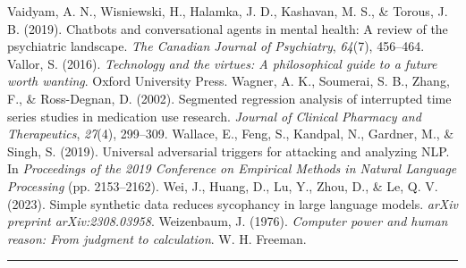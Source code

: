 \documentclass{obelus-preprint}
\begin{document}
Vaidyam, A. N., Wisniewski, H., Halamka, J. D., Kashavan, M. S., \& Torous, J. B. (2019). Chatbots and conversational agents in mental health: A review of the psychiatric landscape. \emph{The Canadian Journal of Psychiatry}, \emph{64}(7), 456--464.
Vallor, S. (2016). \emph{Technology and the virtues: A philosophical guide to a future worth wanting}. Oxford University Press.
Wagner, A. K., Soumerai, S. B., Zhang, F., \& Ross-Degnan, D. (2002). Segmented regression analysis of interrupted time series studies in medication use research. \emph{Journal of Clinical Pharmacy and Therapeutics}, \emph{27}(4), 299--309.
Wallace, E., Feng, S., Kandpal, N., Gardner, M., \& Singh, S. (2019). Universal adversarial triggers for attacking and analyzing NLP. In \emph{Proceedings of the 2019 Conference on Empirical Methods in Natural Language Processing} (pp. 2153--2162).
Wei, J., Huang, D., Lu, Y., Zhou, D., \& Le, Q. V. (2023). Simple synthetic data reduces sycophancy in large language models. \emph{arXiv preprint arXiv:2308.03958}.
Weizenbaum, J. (1976). \emph{Computer power and human reason: From judgment to calculation}. W. H. Freeman.
\bigskip\hrule\bigskip
\end{document}
